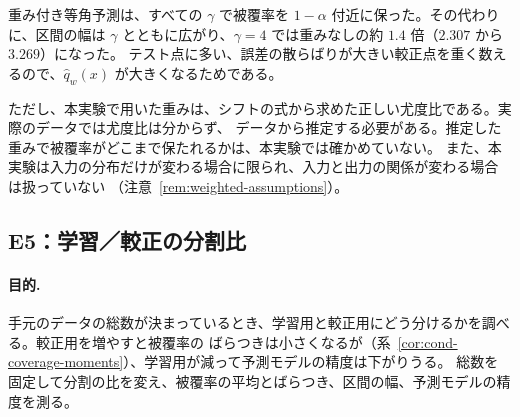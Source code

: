 \documentclass[a4paper,11pt]{jsarticle}
\theoremstyle{definition}
\theoremstyle{plain}
\theoremstyle{remark}
\newcommand{\qhat}{\hat{q}}
\begin{document}
重み付き等角予測は、すべての $\gamma$ で被覆率を $1-\alpha$ 付近に保った。その代わりに、区間の幅は
$\gamma$ とともに広がり、$\gamma=4$ では重みなしの約 $1.4$ 倍（$2.307$ から $3.269$）になった。
テスト点に多い、誤差の散らばりが大きい較正点を重く数えるので、$\qhat_w(x)$ が大きくなるためである。

ただし、本実験で用いた重みは、シフトの式から求めた正しい尤度比である。実際のデータでは尤度比は分からず、
データから推定する必要がある。推定した重みで被覆率がどこまで保たれるかは、本実験では確かめていない。
また、本実験は入力の分布だけが変わる場合に限られ、入力と出力の関係が変わる場合は扱っていない
（注意~\ref{rem:weighted-assumptions}）。


\subsection{E5：学習／較正の分割比}
\label{sec:e5}

\paragraph{目的.}
手元のデータの総数が決まっているとき、学習用と較正用にどう分けるかを調べる。較正用を増やすと被覆率の
ばらつきは小さくなるが（系~\ref{cor:cond-coverage-moments}）、学習用が減って予測モデルの精度は下がりうる。
総数を固定して分割の比を変え、被覆率の平均とばらつき、区間の幅、予測モデルの精度を測る。
\end{document}
